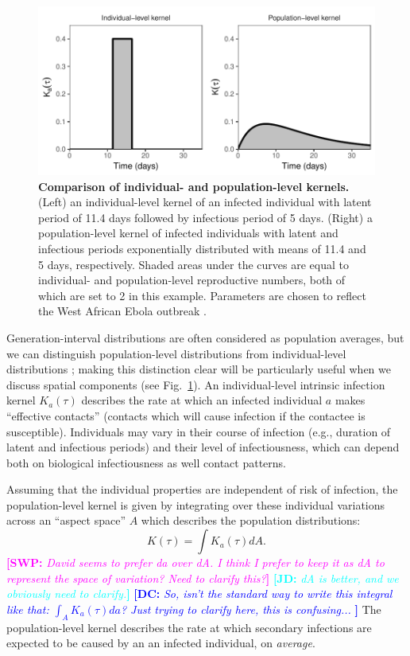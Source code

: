 \documentclass[12pt]{article}
\newcommand{\fref}[1]{Fig.~\ref{fig:#1}}
\newcommand{\comment}[3]{\textcolor{#1}{\textbf{[#2: }\textsl{#3}\textbf{]}}}
\newcommand{\jd}[1]{\comment{cyan}{JD}{#1}}
\newcommand{\swp}[1]{\comment{magenta}{SWP}{#1}}
\newcommand{\dc}[1]{\comment{blue}{DC}{#1}}
\begin{document}
\begin{figure}[!pbth]
\includegraphics[width=\textwidth]{../fig/individual_and_population.pdf}
\caption{\textbf{Comparison of individual- and population-level kernels.}
(Left) an individual-level kernel of an infected individual with latent period of 11.4 days followed by infectious period of 5 days. 
(Right) a population-level kernel of infected individuals with latent and infectious periods exponentially distributed with means of 11.4 and 5 days, respectively. 
Shaded areas under the curves are equal to individual- and population-level reproductive numbers, both of which are set to 2 in this example.
Parameters are chosen to reflect the West African Ebola outbreak \citep{who2014ebola}.}
\label{fig:indpop}
\end{figure}

Generation-interval distributions are often considered as population averages, but we can distinguish population-level distributions from individual-level distributions \citep{svensson2007note, svensson2015influence}; 
making this distinction clear will be particularly useful when we discuss spatial components (see \fref{indpop}).
An individual-level intrinsic infection kernel $K_a(\tau)$ describes the rate at which an infected individual $a$ makes ``effective contacts'' (contacts which will cause infection if the contactee is susceptible).
Individuals may vary in their course of infection (e.g., duration of latent and infectious periods) and their level of infectiousness, which can depend both on biological infectiousness as well contact patterns.

Assuming that the individual properties are independent of risk of infection, the population-level kernel is given by integrating over these individual variations across an ``aspect space'' $A$ which describes the population distributions:
\begin{equation}
K(\tau) = \int K_a (\tau) dA.
\end{equation}
\swp{David seems to prefer da over dA. I think I prefer to keep it as dA to represent the space of variation? Need to clarify this?}
\jd{dA is better, and we obviously need to clarify.}
\dc{So, isn't the standard way to write this integral like that: $ \int_{A} K_a (\tau) da$? Just trying to clarify here, this is confusing... }
The population-level kernel describes the rate at which secondary infections are expected to be caused by an an infected individual, on \emph{average}.
\end{document}
